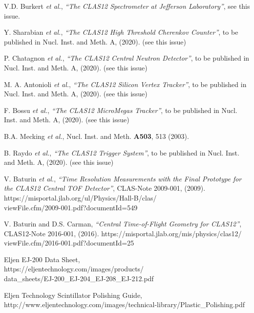 \documentclass[3p,times,twocolumn]{elsarticle}
\begin{document}
\begin{thebibliography}{99}

V.D. Burkert {\it et al.}, {\it ``The CLAS12 Spectrometer at Jefferson Laboratory''}, see this issue.

Y. Sharabian {\it et al.}, {\it ``The CLAS12 High Threshold Cherenkov Counter''}, to be published in Nucl.
Inst. and Meth. A, (2020). (see this issue)
  
P. Chatagnon {\it et al.}, {\it ``The CLAS12 Central Neutron Detector''}, to be published in Nucl. Inst.
and Meth. A, (2020). (see this issue)
  
M. A. Antonioli {\it et al.}, {\it ``The CLAS12 Silicon Vertex Tracker''}, to be published in Nucl. Inst.
and Meth. A, (2020). (see this issue)

F. Bossu {\it et al.}, {\it ``The CLAS12 MicroMegas Tracker''}, to be published in Nucl. Inst.
and Meth. A, (2020). (see this issue)
  
B.A. Mecking {\it et al.}, Nucl. Inst. and Meth. {\bf A503}, 513 (2003).

B. Raydo {\it et al.}, {\it ``The CLAS12 Trigger System''}, to be published in Nucl. Inst. and Meth. A, (2020).
(see this issue)

V. Baturin {\it et al.}, {\it ``Time Resolution Measurements with the Final Prototype for the 
CLAS12 Central TOF Detector''}, CLAS-Note 2009-001, (2009).\\
https://misportal.jlab.org/ul/Physics/Hall-B/clas/\\ viewFile.cfm/2009-001.pdf?documentId=549

V. Baturin and D.S. Carman, {\it ``Central Time-of-Flight Geometry for CLAS12''}, CLAS12-Note 
2016-001, (2016).
https://misportal.jlab.org/mis/physics/clas12/\\ viewFile.cfm/2016-001.pdf?documentId=25

Eljen EJ-200 Data Sheet,\\
https://eljentechnology.com/images/products/\\
data\_sheets/EJ-200\_EJ-204\_EJ-208\_EJ-212.pdf

Eljen Technology Scintillator Polishing Guide,\\
http://www.eljentechnology.com/images/technical-library/Plastic\_Polishing.pdf


\end{thebibliography}
\end{document}
